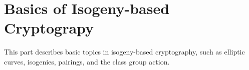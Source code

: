 \documentclass[../../main.tex]{subfiles}  %
\begin{document}
\chapter*{Basics of Isogeny-based Cryptograpy}
This part describes basic topics in isogeny-based cryptography, 
such as elliptic curves, isogenies, pairings, and the class group action.
\end{document}
